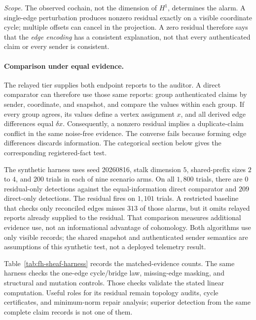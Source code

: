 \documentclass[11pt,a4paper]{article}
\theoremstyle{definition}
\theoremstyle{remark}
\begin{document}
\noindent\emph{Scope.} The observed cochain, not the dimension of
$H^1$, determines the alarm. A single-edge perturbation produces nonzero
residual exactly on a visible coordinate cycle; multiple offsets can cancel
in the projection. A zero residual therefore says that the \emph{edge
encoding} has a consistent explanation, not that every authenticated claim
or every sender is consistent.

\paragraph{Comparison under equal evidence.}
The relayed tier supplies both endpoint reports to the auditor. A direct
comparator can therefore use those same reports: group authenticated claims
by sender, coordinate, and snapshot, and compare the values within each
group. If every group agrees, its values define a vertex assignment $x$,
and all derived edge differences equal $\delta x$. Consequently, a nonzero
residual implies a duplicate-claim conflict in the same noise-free evidence.
The converse fails because forming edge differences discards information.
The categorical section below gives the corresponding registered-fact test.

The synthetic harness 
uses seed 20260816, stalk dimension $5$, shared-prefix sizes $2$ to $4$,
and $200$ trials in each of nine scenario arms. On all $1{,}800$ trials,
there are $0$ residual-only detections against the equal-information direct
comparator and $209$ direct-only detections. The residual fires on $1{,}101$
trials. A restricted baseline that checks only reconciled edges misses $313$
of those alarms, but it omits relayed reports already supplied to the
residual. That comparison measures additional evidence use, not an
informational advantage of cohomology. Both algorithms use only visible
records; the shared snapshot and authenticated sender semantics are
assumptions of this synthetic test, not a deployed telemetry result.

Table~\ref{tab:fh-sheaf-harness} records the matched-evidence counts. The
same harness checks the one-edge cycle/bridge law, missing-edge masking,
and structural and mutation controls. Those checks validate the stated
linear computation. Useful roles for its residual remain topology audits,
cycle certificates, and minimum-norm repair analysis; superior detection
from the same complete claim records is not one of them.


\end{document}
